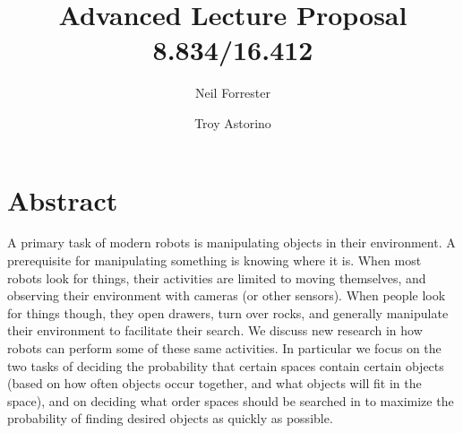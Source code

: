 \documentclass{article}
\title{Advanced Lecture Proposal \\ 8.834/16.412}
\author{Neil Forrester \and Troy Astorino}
\begin{document}
\maketitle


\section{Abstract}
A primary task of modern robots is manipulating objects in their environment. A
prerequisite for manipulating something is knowing where it is. When most robots
look for things, their activities are limited to moving themselves, and
observing their environment with cameras (or other sensors). When people look
for things though, they open drawers, turn over rocks, and generally manipulate
their environment to facilitate their search. We discuss new research in how
robots can perform some of these same activities. In particular we focus on the
two tasks of deciding the probability that certain spaces contain certain
objects (based on how often objects occur together, and what objects will fit in
the space), and on deciding what order spaces should be searched in to maximize
the probability of finding desired objects as quickly as possible.
\end{document}
